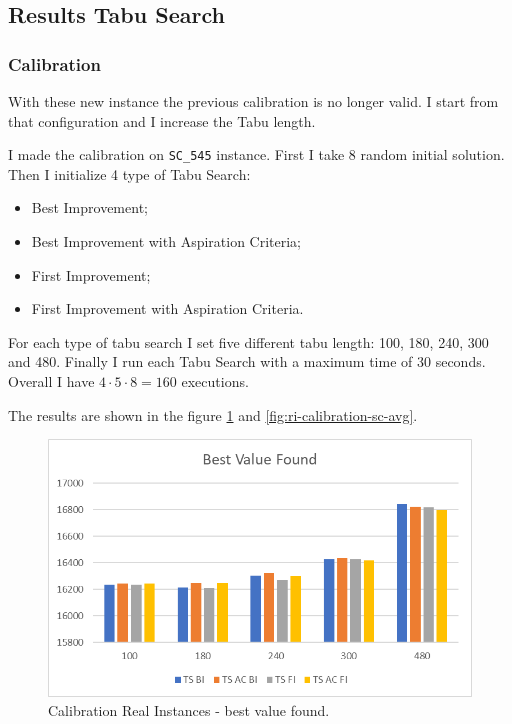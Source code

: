 	
	\newpage
	
	\subsection{Results Tabu Search}
	
		\subsubsection{Calibration}
			With these new instance the previous calibration is no longer valid. I start from that configuration and I increase the Tabu length.
			
			I made the calibration on \verb|SC_545| instance.
			First I take 8 random initial solution. Then I initialize 4 type of Tabu Search:
			\begin{itemize}
				\item Best Improvement;
				\item Best Improvement with Aspiration Criteria;
				\item First Improvement;
				\item First Improvement with Aspiration Criteria.
			\end{itemize}
			For each type of tabu search I set five different tabu length: 100, 180, 240, 300 and 480. Finally I run each Tabu Search with a maximum time of 30 seconds.  Overall I have $4 \cdot 5 \cdot 8 = 160 $ executions. 
			
			The results are shown in the figure \ref{fig:ri-calibration-sc} and \ref{fig:ri-calibration-sc-avg}.
			
			\begin{figure} [hb]
				\centering
				\includegraphics[width=\linewidth]{img/RI-calibration-SC}
				\caption{Calibration Real Instances - best value found.}
				\label{fig:ri-calibration-sc}
			\end{figure}

